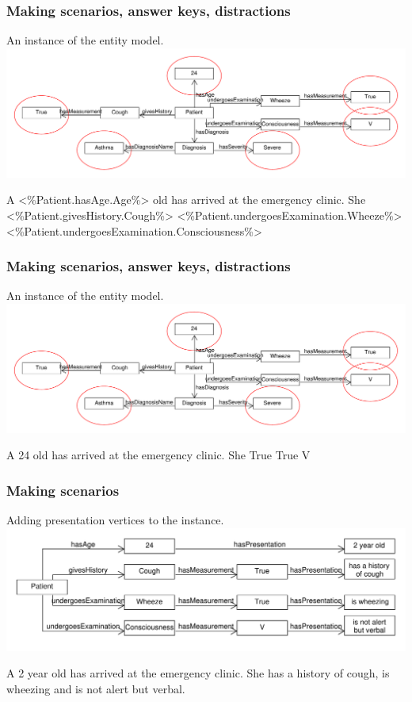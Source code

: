 \documentclass{beamer}
\begin{document}
\begin{frame}[fragile]
\frametitle{Making scenarios, answer keys, distractions}
An instance of the entity model.
\includegraphics[scale=0.35]{EntityInstanceGraph}
\begin{semiverbatim}
A <\%Patient.hasAge.Age\%> old has arrived at the 
emergency clinic.  
She <\%Patient.givesHistory.Cough\%> 
<\%Patient.undergoesExamination.Wheeze\%>
<\%Patient.undergoesExamination.Consciousness\%>
\end{semiverbatim}
\end{frame}

\begin{frame}[fragile]
\frametitle{Making scenarios, answer keys, distractions}
An instance of the entity model.
\includegraphics[scale=0.35]{EntityInstanceGraph}
\begin{semiverbatim}
	A 24 old has arrived at the 
	emergency clinic.  
	She True
	True
	V
\end{semiverbatim}
\end{frame}

\begin{frame}[fragile]
\frametitle{Making scenarios}
Adding presentation vertices to the instance.
\includegraphics[scale=0.45]{PresentationEntityGraph}
\begin{semiverbatim}
	A 2 year old has arrived at the 
	emergency clinic.  
	She has a history of cough, 
	is wheezing
	and is not alert but verbal.
\end{semiverbatim}
\end{frame}
\end{document}

